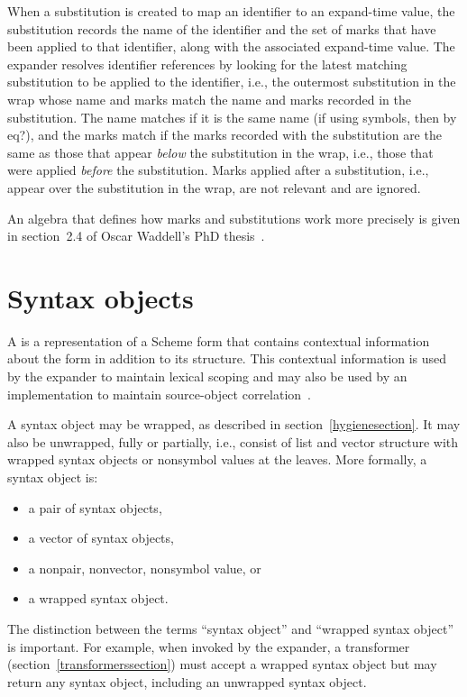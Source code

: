 When a substitution is created to map an identifier to an expand-time
value, the substitution records the name of the identifier and
the set of marks that have been applied to that identifier, along
with the associated expand-time value.
The expander resolves identifier references by looking for the latest
matching substitution to be applied to the identifier, i.e., the outermost
substitution in the wrap whose name and marks match the name and
marks recorded in the substitution.
The name matches if it is the same name (if using symbols, then by
{\cf eq?}), and the marks match if the marks recorded with the
substitution are the same as those that appear \emph{below} the
substitution in the wrap, i.e., those that were applied \emph{before} the
substitution.
Marks applied after a substitution, i.e., appear over the substitution in
the wrap, are not relevant and are ignored.

An algebra that defines how marks and substitutions work more precisely is
given in section~2.4 of Oscar Waddell's PhD thesis~\cite{Waddellphd}.

\section{Syntax objects}
\label{syntaxobjectssection}

A  is a representation of a Scheme form that contains
contextual information about the form in addition to its structure.
This contextual information is used by the expander to maintain
lexical scoping and may also be used by an implementation to maintain
source-object correlation~\cite{syntacticabstraction}.

A syntax object may be wrapped, as described in section~\ref{hygienesection}.
It may also be unwrapped, fully or partially, i.e., consist of list and
vector structure with wrapped syntax objects or nonsymbol values at the
leaves.
More formally, a syntax object is:

\begin{itemize}
\item a pair of syntax objects,
\item a vector of syntax objects,
\item a nonpair, nonvector, nonsymbol value, or
\item a wrapped syntax object.
\end{itemize}

The distinction between the terms ``syntax object'' and ``wrapped syntax
object'' is important.
For example, when invoked by the expander, a transformer
(section~\ref{transformerssection}) must accept a wrapped syntax object but
may return any syntax object, including an unwrapped syntax object.

